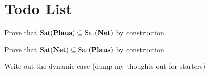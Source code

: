 \documentclass[letterpaper]{article}
\begin{document}
\section*{Todo List}
\begin{todolist}
    \item Prove that $\mathrm{Sat}( \textrm{\textbf{Plaus}} ) \subseteq \mathrm{Sat}( \textrm{\textbf{Net}} )$ by construction.
    \item Prove that $\mathrm{Sat}( \textrm{\textbf{Net}} ) \subseteq \mathrm{Sat}( \textrm{\textbf{Plaus}} )$ by construction.
    \item Write out the dynamic case (dump my thoughts out for starters)
\end{todolist}





\printbibliography
\end{document}
